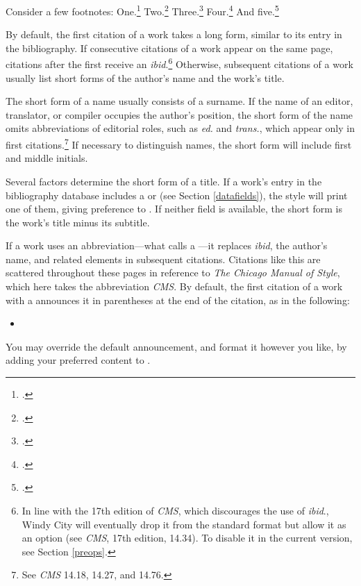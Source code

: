 \documentclass[11pt,letterpaper,oneside]{article}
\begin{document}
Consider a few footnotes: One.\footcite{beattie1974}
Two.\footcite[51]{beattie1974} Three.\footcite[51]{beattie1974}
Four.\footcite[35]{shields2008} And five.\footcite[51]{beattie1974}

By default, the first citation of a work takes a long form, similar to
its entry in the bibliography. If consecutive citations of a work
appear on the same page, citations after the first receive an
\textit{ibid}.\footnote{In line with the 17th edition of \textit{CMS},
which discourages the use of \textit{ibid}., Windy City will
eventually drop it from the standard format but allow it as an option
(see \textit{CMS}, 17th edition, 14.34).\nocite{chicago2017} To
disable it in the current version, see Section \ref{preops}.}
Otherwise, subsequent citations of a work usually list short forms of
the author's name and the work's title.

The short form of a name usually consists of a surname. If the name of
an editor, translator, or compiler occupies the author's position, the
short form of the name omits abbreviations of editorial roles, such as
\textit{ed.} and \textit{trans.}, which appear only in first
citations.\footnote{See \textit{CMS} 14.18, 14.27, and 14.76.} If
necessary to distinguish names, the short form will include first and
middle initials.

Several factors determine the short form of a title. If a work's entry
in the bibliography database includes a  or
 (see Section \ref{datafields}), the style
will print one of them, giving preference to . If
neither field is available, the short form is the work's title minus
its subtitle.

If a work uses an abbreviation---what \biblatex calls a
---it replaces \textit{ibid}, the author's name,
and related elements in subsequent citations. Citations like
this are scattered throughout these pages in reference to \textit{The
Chicago Manual of Style}, which here takes the abbreviation
\textit{CMS}. By default, the first citation of a work with a
 announces it in parentheses at the end of the
citation, as in the following:

\begin{itemize}
\item[] 
\end{itemize}

\noindent You may override the default announcement, and format it
however you like, by adding your preferred content to
.
\end{document}
